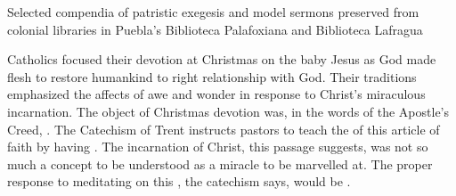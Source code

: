 {Selected compendia of patristic exegesis and model sermons preserved from
colonial libraries in Puebla's Biblioteca Palafoxiana and Biblioteca Lafragua}

Catholics focused their devotion at Christmas on the baby Jesus as God
made flesh to restore humankind to right relationship with God. 
Their traditions emphasized the affects of awe and wonder in response to
Christ's miraculous incarnation.
The object of Christmas devotion was, in the words of the Apostle's Creed,
.%
    \Autocites[34, 46]{Catholic:Catechismus1614}
The Catechism of Trent instructs pastors to teach the 
of this article of faith by having .%
    \Autocite[50]{Catholic:Catechismus1614}
The incarnation of Christ, this passage suggests, was not so much a concept to
be understood as a miracle to be marvelled at.
The proper response to meditating on this , the
catechism says, would be .%
    \Autocite[50]{Catholic:Catechismus1614}

